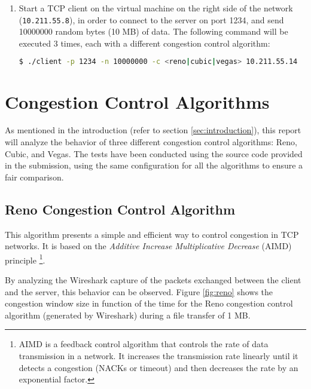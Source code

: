 \documentclass[a4paper, 11pt]{article}
\begin{document}
\begin{enumerate}
	\item Start a TCP client on the virtual machine on the right side of the network (\texttt{10.211.55.8}), in order to connect to the server on port 1234, and send 10000000 random bytes (10 MB) of data. The following command will be executed 3 times, each with a different congestion control algorithm:
	      \begin{adjustwidth}{-10cm}{}
		      \begin{lstlisting}[language=bash]
						$ ./client -p 1234 -n 10000000 -c <reno|cubic|vegas> 10.211.55.14
					\end{lstlisting}
	      \end{adjustwidth}
\end{enumerate}

\pagebreak

\section{Congestion Control Algorithms}

As mentioned in the introduction (refer to section \ref{sec:introduction}), this report will analyze the behavior of three different congestion control algorithms: Reno, Cubic, and Vegas. The tests have been conducted using the source code provided in the submission, using the same configuration for all the algorithms to ensure a fair comparison.

\subsection{Reno Congestion Control Algorithm}
\label{sec:reno}

This algorithm presents a simple and efficient way to control congestion in TCP networks. It is based on the \textit{Additive Increase Multiplicative Decrease} (AIMD) principle \footnote{AIMD is a feedback control algorithm that controls the rate of data transmission in a network. It increases the transmission rate linearly until it detects a congestion (NACKs or timeout) and then decreases the rate by an exponential factor.\cite{wiki:tcp_congestion_control}}.

By analyzing the Wireshark capture of the packets exchanged between the client and the server, this behavior can be observed. Figure \ref{fig:reno} shows the congestion window size in function of the time for the Reno congestion control algorithm (generated by Wireshark) during a file transfer of 1 MB.
\end{document}
